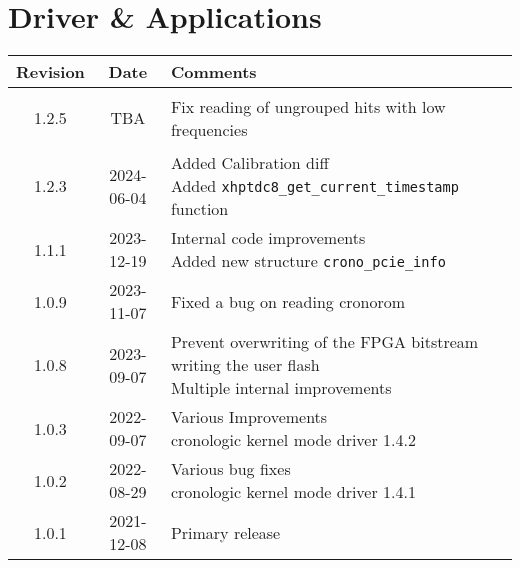 \section{Driver \& Applications}
\begin{tabularx}{\textwidth}{|c|c|X|}
    \hline
    Revision & Date & Comments\\
    \hline\hline
    \hypertarget{drvrev}{1.2.5} & TBA &
    \makecell[l]{
        Fix reading of ungrouped hits with low frequencies\\*
    }\\
    1.2.3 & 2024-06-04 &
    \makecell[l]{
        Added Calibration diff\\*
        Added \texttt{xhptdc8\_get\_current\_timestamp} function\\*
    }\\
    \hline
    1.1.1 & 2023-12-19 &
    \makecell[l]{
        Internal code improvements\\*
        Added new structure \texttt{crono\_pcie\_info}
    }\\
    \hline
    1.0.9 & 2023-11-07 & Fixed a bug on reading cronorom   \\
    \hline
    1.0.8 & 2023-09-07 &
    \makecell[l]{
        Prevent overwriting of the FPGA bitstream writing the user flash\\*
        Multiple internal improvements
    }\\
    \hline
    1.0.3 & 2022-09-07 &
    \makecell[l]{
        Various Improvements\\*
        cronologic kernel mode driver 1.4.2
    }\\
    \hline
    1.0.2 & 2022-08-29 &
    \makecell[l]{
        Various bug fixes\\*
        cronologic kernel mode driver 1.4.1
    }\\
    \hline
    1.0.1 & 2021-12-08 & Primary release\\
    \hline
\end{tabularx}